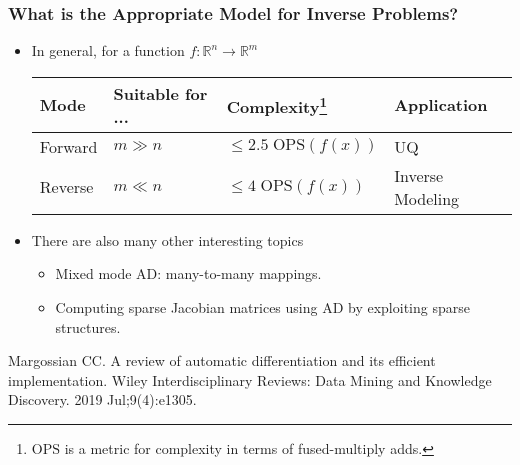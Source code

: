 \documentclass[usenames,dvipsnames]{beamer}
\newcommand{\RR}[0]{\mathbb{R}}
\begin{document}
\begin{frame}
	\frametitle{What is the Appropriate Model for Inverse Problems?}
	
	\begin{itemize}
		\item In general, for a function $f:\RR^n \rightarrow \RR^m$
\begin{table}[]
\centering
\begin{tabular}{@{}llll@{}}
\toprule
Mode & Suitable for ... & Complexity\footnote{$\mathrm{OPS}$ is a metric for complexity in terms of fused-multiply adds.} & Application \\ \midrule
Forward & $m\gg n$ & $\leq 2.5\;\mathrm{OPS}(f(x))$ & UQ \\
Reverse & $m\ll n$ & $\leq 4\;\mathrm{OPS}(f(x))$ & Inverse Modeling \\ \bottomrule
\end{tabular}
\end{table}
	
		
		\item There are also many other interesting topics
		\begin{itemize}
		\item Mixed mode AD: many-to-many mappings.
		\item Computing sparse Jacobian matrices using AD by exploiting sparse structures. 
		\end{itemize}
	\end{itemize}
	{\scriptsize Margossian CC. A review of automatic differentiation and its efficient implementation. Wiley Interdisciplinary Reviews: Data Mining and Knowledge Discovery. 2019 Jul;9(4):e1305.} 
\end{frame}
\end{document}
